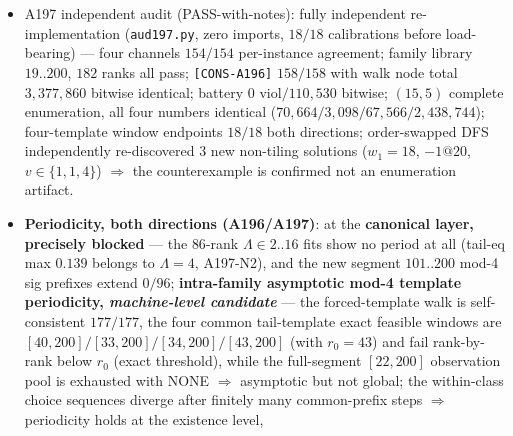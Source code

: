 \begin{itemize}
root identified by A193-N1; machine check $=$ solution library $154$
instances, three decision channels agree $154/154$
(labA196/labA186/labA193), and the skeleton face (i)/dichotomy/
tiling$\iff$(ii) $148/148\times3$ (tiling $147$ $+$ non-tiling $1$ = the
A193 counterexample $v=r-3=19$, $-1$ at edge position $6$); an
\textbf{unbiased complete enumeration} (enumerator without an $h$ target
set) over $r=15/16$, all ranks with zero truncation: non-tiling solutions
occupy ${\sim}96\%$ ($r=15/u=5$: $67{,}566/70{,}664=95.6\%$; $r=16$, each
$u$, $97.5$--$98.6\%$) $\Rightarrow$ the A193 counterexample is not
isolated, and the tiling type is a minority of the solution space;
$(15,11)$ complete with zero solutions; $(15,12)/(16,12)$ zero solutions =
\textbf{paper-level emptiness} (skeleton mutual-difference must fail:
link$=r-2$ collisions $[2,0,13,14,13]$/$[2,0,14,15,14]$; must not be
labelled ``complete enumeration'', A197-N3).
\item A197 independent audit (PASS-with-notes): fully independent
re-implementation (\texttt{aud197.py}, zero imports, $18/18$ calibrations
before load-bearing) --- four channels $154/154$ per-instance agreement;
family library $19..200$, $182$ ranks all pass; \texttt{[CONS-A196]}
$158/158$ with walk node total $3{,}377{,}860$ bitwise identical; battery
$0$ viol$/110{,}530$ bitwise; $(15,5)$ complete enumeration, all four
numbers identical ($70{,}664/3{,}098/67{,}566/2{,}438{,}744$); four-template
window endpoints $18/18$ both directions; order-swapped DFS independently
re-discovered $3$ new non-tiling solutions ($w_1=18$, $-1@20$,
$v\in\{1,1,4\}$) $\Rightarrow$ the counterexample is confirmed not an
enumeration artifact.
\item \textbf{Periodicity, both directions (A196/A197)}: at the
\textbf{canonical layer, precisely blocked} --- the $86$-rank
$\Lambda\in2..16$ fits show no period at all (tail-eq max $0.139$ belongs to
$\Lambda=4$, A197-N2), and the new segment $101..200$ mod-4 sig prefixes
extend $0/96$; \textbf{intra-family asymptotic mod-4 template periodicity,
\emph{machine-level candidate}} --- the forced-template walk is
self-consistent $177/177$, the four common tail-template exact feasible
windows are $[40,200]/[33,200]/[34,200]/[43,200]$ (with $r_0=43$) and fail
rank-by-rank below $r_0$ (exact threshold), while the full-segment
$[22,200]$ observation pool is exhausted with NONE $\Rightarrow$ asymptotic
but not global; the within-class choice sequences diverge after finitely many
common-prefix steps $\Rightarrow$ periodicity holds at the existence level,

\end{itemize}
